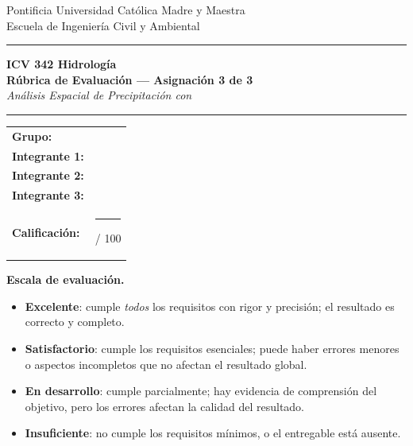 \documentclass[11pt]{article}
\begin{document}
\begin{center}
  {\small\color{midgrey}
    Pontificia Universidad Católica Madre y Maestra\\
    Escuela de Ingeniería Civil y Ambiental}
  \vspace{0.9cm}
  {\color{olive}\rule{\linewidth}{2pt}}\vspace{0.3cm}
  {\Large\bfseries\color{darkblue} ICV 342 Hidrología}\\[0.3em]
  {\large\bfseries\color{darkblue} Rúbrica de Evaluación --- Asignación 3 de 3}\\[0.2em]
  {\normalsize\itshape Análisis Espacial de Precipitación con \qgis{}}
  \vspace{0.3cm}
  {\color{olive}\rule{\linewidth}{2pt}}
\end{center}
\vspace{0.4em}
\begin{center}
\begin{tabularx}{\textwidth}{lX}
\toprule
\textbf{Grupo:}        & \hrulefill \\[9pt]
\textbf{Integrante 1:} & \hrulefill \\[9pt]
\textbf{Integrante 2:} & \hrulefill \\[9pt]
\textbf{Integrante 3:} & \hrulefill \\[9pt]
\textbf{Calificación:} & \rule{2.5cm}{0.4pt}\;/ 100 \\
\bottomrule
\end{tabularx}
\end{center}
\vspace{0.5em}

\begin{olivebox}
\textbf{Escala de evaluación.}
\begin{itemize}
  \item \textbf{Excelente}: cumple \emph{todos} los requisitos con rigor
    y precisión; el resultado es correcto y completo.
  \item \textbf{Satisfactorio}: cumple los requisitos esenciales; puede haber
    errores menores o aspectos incompletos que no afectan el resultado global.
  \item \textbf{En desarrollo}: cumple parcialmente; hay evidencia de
    comprensión del objetivo, pero los errores afectan la calidad del resultado.
  \item \textbf{Insuficiente}: no cumple los requisitos mínimos,
    o el entregable está ausente.
\end{itemize}
\end{olivebox}
\end{document}
